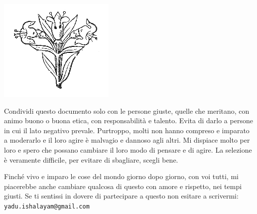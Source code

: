 \vspace*{\fill}
\begin{center}
\noindent\includegraphics[width=\textwidth/5]{fleur.png}
\end{center}
\vspace*{\fill}

\clearpage

Condividi questo documento solo con le persone giuste, quelle che meritano, con animo buono o buona etica, con responsabilità e talento. Evita di darlo a persone in cui il lato negativo prevale. Purtroppo, molti non hanno compreso e imparato a moderarlo e il loro agire è malvagio e dannoso agli altri. Mi dispiace molto per loro e spero che possano cambiare il loro modo di pensare e di agire. La selezione è veramente difficile, per evitare di sbagliare, scegli bene.

Finché vivo e imparo le cose del mondo giorno dopo giorno, con voi tutti, mi piacerebbe anche cambiare qualcosa di questo con amore e rispetto, nei tempi giusti. Se ti sentissi in dovere di partecipare a questo non esitare a scrivermi:
\tt
yadu.ishalayam@gmail.com
\rm
